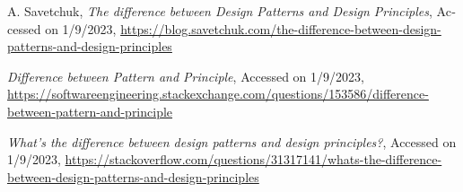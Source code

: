 {\begin{latin}
\begin{thebibliography}{9}
	A. Savetchuk,
	\textit{The difference between Design Patterns and Design Principles},
	Accessed on 1/9/2023,
	\url{https://blog.savetchuk.com/the-difference-between-design-patterns-and-design-principles}
	
	
	\textit{Difference between Pattern and Principle},
	Accessed on 1/9/2023,
	\url{https://softwareengineering.stackexchange.com/questions/153586/difference-between-pattern-and-principle}

	\textit{What's the difference between design patterns and design principles?},
	Accessed on 1/9/2023,
	\url{https://stackoverflow.com/questions/31317141/whats-the-difference-between-design-patterns-and-design-principles}
\end{thebibliography}
\endgroup
\end{latin}

}

